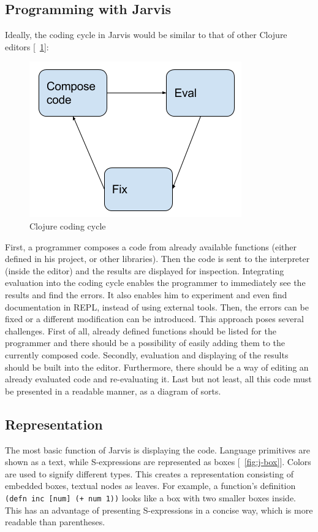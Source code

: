 \documentclass[11pt]{scrartcl}
\newcommand*{\figref}[1]{[\textbf{\figurename}~\ref{#1}]}
\begin{document}
\subsection{Programming with Jarvis}
Ideally, the coding cycle in Jarvis would be similar to that of other Clojure
editors \figref{fig:clojure-coding}:

\begin{figure}[hbt]
  \centering
  \includegraphics[scale=0.5]{img/Programming.png}
  \caption{Clojure coding cycle}
\label{fig:clojure-coding}
\end{figure}

First, a programmer composes a code from already available functions (either
defined in his project, or other libraries).
Then the code is sent to the interpreter (inside the editor) and the results are
displayed for inspection.
Integrating evaluation into the coding cycle enables the programmer to
immediately see the results and find the errors.
It also enables him to experiment and even find documentation in REPL, instead
of using external tools.
Then, the errors can be fixed or a different modification can be introduced.
This approach poses several challenges.
First of all, already defined functions should be listed for the programmer and
there should be a possibility of easily adding them to the currently composed
code.
Secondly, evaluation and displaying of the results should be built into the
editor.
Furthermore, there should be a way of editing an already evaluated code and
re-evaluating it.
Last but not least, all this code must be presented in a readable manner, as a
diagram of sorts.

\subsection{Representation}
The most basic function of Jarvis is displaying the code.
Language primitives are shown as a text, while S-expressions are
represented as boxes \figref{fig:j-box}.
Colors are used to signify different types.
This creates a representation consisting of embedded boxes, textual nodes as
leaves.
For example, a function’s definition \lstinline|(defn inc [num] (+ num 1))| looks like a box
with two smaller boxes inside.
This has an advantage of presenting S-expressions in a concise way, which is
more readable than parentheses.
\end{document}
